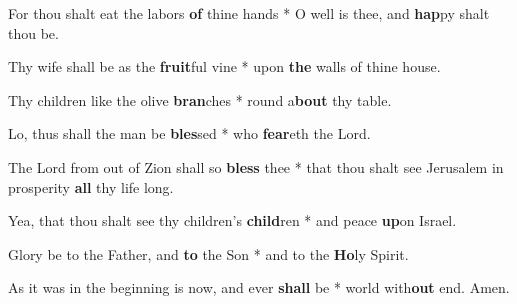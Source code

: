 \begin{multicols}{2}
	For thou shalt eat the labors \textbf{of} thine hands * O well is thee, and \textbf{hap}py shalt thou be.
	
	Thy wife shall be as the \textbf{fruit}ful vine * upon \textbf{the} walls of thine house.
	
	Thy children like the olive \textbf{bran}ches * round a\textbf{bout} thy table.
	
	Lo, thus shall the man be \textbf{bles}sed * who \textbf{fear}eth the Lord.
	
	The Lord from out of Zion shall so \textbf{bless} thee * that thou shalt see Jerusalem in prosperity \textbf{all} thy life long.
	
	Yea, that thou shalt see thy children's \textbf{child}ren * and peace \textbf{up}on Israel.
	
	Glory be to the Father, and \textbf{to} the Son * and to the \textbf{Ho}ly Spirit.
	
	As it was in the beginning is now, and ever \textbf{shall} be * world with\textbf{out} end. Amen.
\end{multicols}